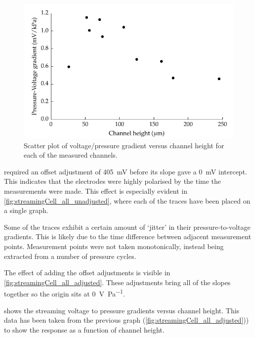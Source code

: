       \begin{figure}
          \centering
          \includegraphics{content/pt1/01-PowerHarvesting/graphics/streamingCell_slopeVsChannelHeight}
          \caption{\label{fig:streamingCell_scatter_voltGradVsHeight}Scatter plot of voltage/pressure gradient versus channel height for each of the measured channels.}
      \end{figure}

       required an offset adjustment of \SI{405}{\milli\volt} before its slope gave a \SI{0}{\milli\volt} intercept.
      This indicates that the electrodes were highly polarised by the time the measurements were made.
      This effect is especially evident in \cref{fig:streamingCell_all_unadjusted}, where each of the traces have been placed on a single graph.

      Some of the traces exhibit a certain amount of `jitter' in their pressure-to-voltage gradients.
      This is likely due to the time difference between adjacent measurement points.
      Measurement points were not taken monotonically, instead being extracted from a number of pressure cycles.

      The effect of adding the offset adjustments is visible in \cref{fig:streamingCell_all_adjusted}.
      These adjustments bring all of the slopes together so the origin sits at \SI{0}{\volt\per\pascal}.

       shows the streaming voltage to pressure gradients versus channel height.
      This data has been taken from the previous graph (\cref{fig:streamingCell_all_adjusted})) to show the response as a function of channel height.


